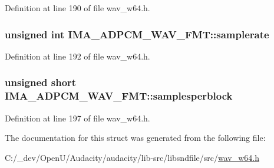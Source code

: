 Definition at line 190 of file wav\+\_\+w64.\+h.

\subsubsection[{\texorpdfstring{samplerate}{samplerate}}]{\setlength{\rightskip}{0pt plus 5cm}unsigned {\bf int} I\+M\+A\+\_\+\+A\+D\+P\+C\+M\+\_\+\+W\+A\+V\+\_\+\+F\+M\+T\+::samplerate}\hypertarget{struct_i_m_a___a_d_p_c_m___w_a_v___f_m_t_a65cfee0844b5d6a9db8b479eeb32e649}{}\label{struct_i_m_a___a_d_p_c_m___w_a_v___f_m_t_a65cfee0844b5d6a9db8b479eeb32e649}


Definition at line 192 of file wav\+\_\+w64.\+h.

\subsubsection[{\texorpdfstring{samplesperblock}{samplesperblock}}]{\setlength{\rightskip}{0pt plus 5cm}unsigned short I\+M\+A\+\_\+\+A\+D\+P\+C\+M\+\_\+\+W\+A\+V\+\_\+\+F\+M\+T\+::samplesperblock}\hypertarget{struct_i_m_a___a_d_p_c_m___w_a_v___f_m_t_ac9f167c103fa30ec8bf5827433edb90e}{}\label{struct_i_m_a___a_d_p_c_m___w_a_v___f_m_t_ac9f167c103fa30ec8bf5827433edb90e}


Definition at line 197 of file wav\+\_\+w64.\+h.



The documentation for this struct was generated from the following file\+:\begin{DoxyCompactItemize}
\item 
C\+:/\+\_\+dev/\+Open\+U/\+Audacity/audacity/lib-\/src/libsndfile/src/\hyperlink{wav__w64_8h}{wav\+\_\+w64.\+h}\end{DoxyCompactItemize}
